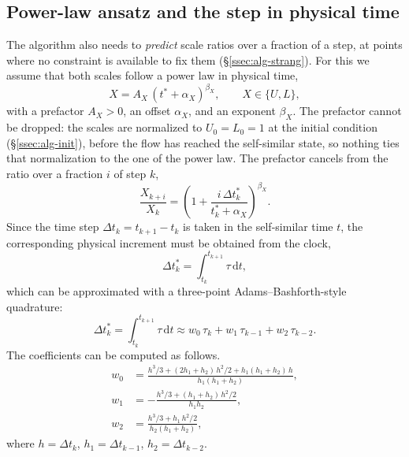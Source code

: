 \documentclass{article}
\begin{document}
\subsection{Power-law ansatz and the step in physical time}\label{ssec:fw-powerlaw}

The algorithm also needs to \emph{predict} scale ratios over a fraction of a
step, at points where no constraint is available to fix them
(\S\ref{ssec:alg-strang}). For this we assume that both scales follow a power
law in physical time,
\begin{equation}\label{eq:fw-powerlaw}
  X = A_X\, (t^* + \alpha_X)^{\beta_X}, \qquad X \in \{U, L\},
\end{equation}
with a prefactor $A_X > 0$, an offset $\alpha_X$, and an exponent $\beta_X$.
The prefactor cannot be dropped: the scales are normalized to $U_0 = L_0 = 1$
at the initial condition (\S\ref{ssec:alg-init}), before the flow has reached
the self-similar state, so nothing ties that normalization to the one of the
power law. The prefactor cancels from the ratio over a fraction $i$ of step
$k$,
\begin{equation}\label{eq:fw-powerlaw-ratio}
  \frac{X_{k+i}}{X_k} = \left( 1 + \frac{i\, \Delta t_k^*}{t_k^* + \alpha_X} \right)^{\beta_X}.
\end{equation}
Since the time step $\Delta t_k = t_{k+1} - t_k$ is taken in the
self-similar time $t$, the corresponding physical increment must be obtained
from the clock,
\begin{equation}
  \Delta t_k^* = \int_{t_k}^{t_{k+1}} \tau\, \mathrm{d} t,
\end{equation}
which can be approximated with a three-point Adams--Bashforth-style quadrature:
\begin{equation}\label{eq:fw-dtstar}
  \Delta t_k^* = \int_{t_k}^{t_{k+1}} \tau\, \mathrm{d} t
  \approx w_0\, \tau_k + w_1\, \tau_{k-1} + w_2\, \tau_{k-2}.
\end{equation}
The coefficients can be computed as follows.
\begin{equation}\label{eq:fw-dtstar-weights}
  \begin{aligned}
    w_0 &= \frac{h^3/3 + (2h_1 + h_2)\, h^2/2 + h_1 (h_1 + h_2)\, h}{h_1 (h_1 + h_2)}, \\
    w_1 &= -\frac{h^3/3 + (h_1 + h_2)\, h^2/2}{h_1 h_2}, \\
    w_2 &= \frac{h^3/3 + h_1\, h^2/2}{h_2 (h_1 + h_2)},
  \end{aligned}
\end{equation}
where $h = \Delta t_k$, $h_1 = \Delta t_{k-1}$, $h_2 = \Delta t_{k-2}$.
\end{document}
